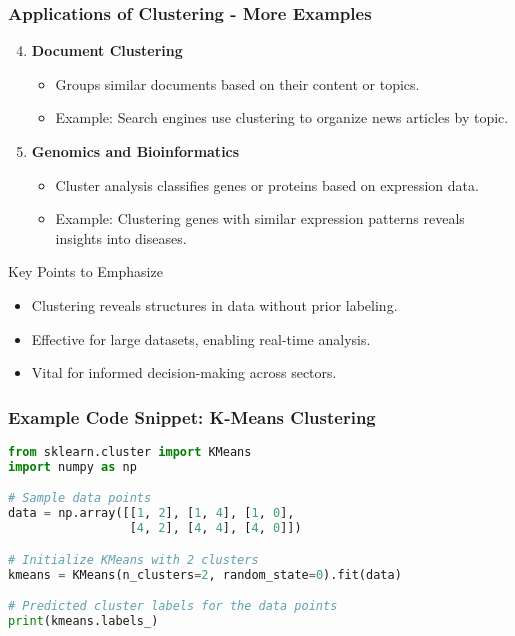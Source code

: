 \documentclass[aspectratio=169]{beamer}
\begin{document}
\begin{frame}[fragile]
    \frametitle{Applications of Clustering - More Examples}
    \begin{enumerate}
        \setcounter{enumi}{3}
        
        \item \textbf{Document Clustering}
            \begin{itemize}
                \item Groups similar documents based on their content or topics.
                \item Example: Search engines use clustering to organize news articles by topic.
            \end{itemize}
        
        \item \textbf{Genomics and Bioinformatics}
            \begin{itemize}
                \item Cluster analysis classifies genes or proteins based on expression data.
                \item Example: Clustering genes with similar expression patterns reveals insights into diseases.
            \end{itemize}
    \end{enumerate}

    \begin{block}{Key Points to Emphasize}
        \begin{itemize}
            \item Clustering reveals structures in data without prior labeling.
            \item Effective for large datasets, enabling real-time analysis.
            \item Vital for informed decision-making across sectors.
        \end{itemize}
    \end{block}
\end{frame}

\begin{frame}[fragile]
    \frametitle{Example Code Snippet: K-Means Clustering}
    \begin{lstlisting}[language=Python]
from sklearn.cluster import KMeans
import numpy as np

# Sample data points
data = np.array([[1, 2], [1, 4], [1, 0], 
                 [4, 2], [4, 4], [4, 0]])

# Initialize KMeans with 2 clusters
kmeans = KMeans(n_clusters=2, random_state=0).fit(data)

# Predicted cluster labels for the data points
print(kmeans.labels_)
    \end{lstlisting}
\end{frame}
\end{document}
